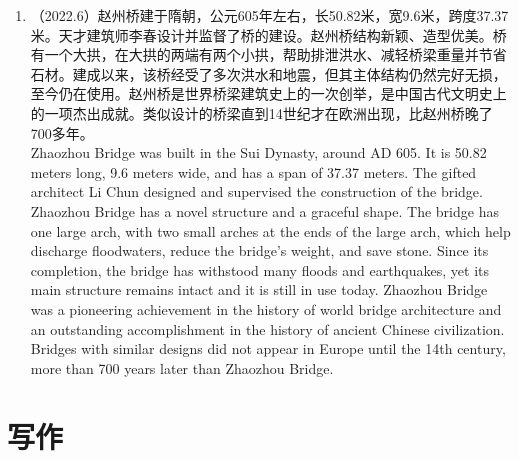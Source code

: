 ﻿\documentclass[lang=cn,11pt]{elegantbook}
\begin{document}
\begin{enumerate}
    \item （2022.6）赵州桥建于隋朝，公元605年左右，长50.82米，宽9.6米，跨度37.37米。天才建筑师李春设计并监督了桥的建设。赵州桥结构新颖、造型优美。桥有一个大拱，在大拱的两端有两个小拱，帮助排泄洪水、减轻桥梁重量并节省石材。建成以来，该桥经受了多次洪水和地震，但其主体结构仍然完好无损，至今仍在使用。赵州桥是世界桥梁建筑史上的一次创举，是中国古代文明史上的一项杰出成就。类似设计的桥梁直到14世纪才在欧洲出现，比赵州桥晚了700多年。\\Zhaozhou Bridge was built in the Sui Dynasty, around AD 605. It is 50.82 meters long, 9.6 meters wide, and has a span of 37.37 meters. The gifted architect Li Chun designed and supervised the construction of the bridge. Zhaozhou Bridge has a novel structure and a graceful shape. The bridge has one large arch, with two small arches at the ends of the large arch, which help discharge floodwaters, reduce the bridge’s weight, and save stone. Since its completion, the bridge has withstood many floods and earthquakes, yet its main structure remains intact and it is still in use today. Zhaozhou Bridge was a pioneering achievement in the history of world bridge architecture and an outstanding accomplishment in the history of ancient Chinese civilization. Bridges with similar designs did not appear in Europe until the 14th century, more than 700 years later than Zhaozhou Bridge.
\end{enumerate}














\chapter{写作}



\end{document}
